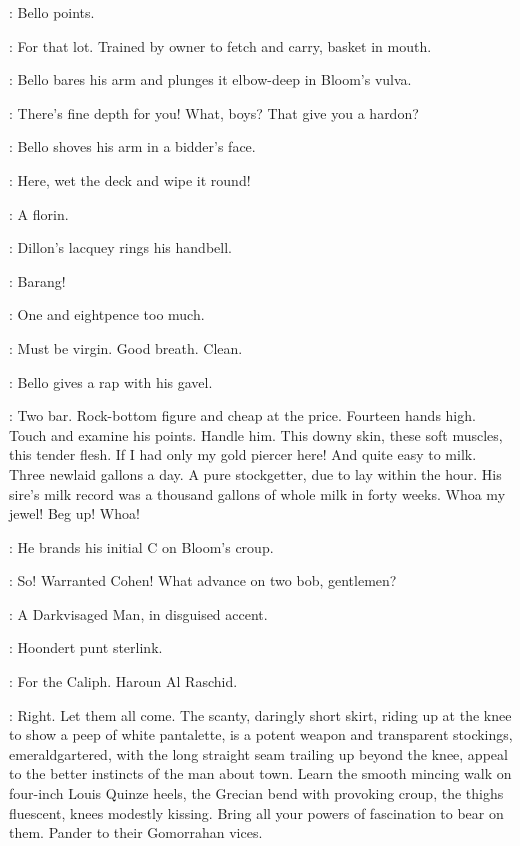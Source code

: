:
Bello points.

\Bello:
For that lot.
Trained by owner to fetch and carry, basket in mouth.

:
Bello bares his arm and plunges it elbow-deep in Bloom's vulva.

\Bello:
There's fine depth for you!
What, boys?
That give you a hardon?

:
Bello shoves his arm in a bidder's face.

\Bello:
Here, wet the deck and wipe it round!

\Bidder:
A florin.

:
Dillon's lacquey rings his handbell.

\Lacquey:
Barang!

\Voice:
One and eightpence too much.

\Marsh[2]:
Must be virgin.
Good breath.
Clean.

:
Bello gives a rap with his gavel.

\Bello:
Two bar.
Rock-bottom figure and cheap at the price.
Fourteen hands high.
Touch and examine his points.
Handle him.
This downy skin, these soft muscles, this tender flesh.
If I had only my gold piercer here!
And quite easy to milk.
Three newlaid gallons a day.
A pure stockgetter, due to lay within the hour.
His sire's milk record was a thousand gallons of whole milk in forty weeks.
Whoa my jewel!
Beg up!
Whoa!

:
He brands his initial C on Bloom's croup.

\Bello:
So!
Warranted Cohen!
What advance on two bob, gentlemen?

:
A Darkvisaged Man, in disguised accent.

\DarkvisagedMan:
Hoondert punt sterlink.

\Voices:
For the Caliph.
Haroun Al Raschid.

\Bello:
Right.
Let them all come.
The scanty, daringly short skirt,
riding up at the knee to show a peep of white pantalette,
is a potent weapon and transparent stockings, emeraldgartered,
with the long straight seam trailing up beyond the knee,
appeal to the better instincts of the  man about town.
Learn the smooth mincing walk on four-inch Louis Quinze heels,
the Grecian bend with provoking croup,
the thighs fluescent, knees modestly kissing.
Bring all your powers of fascination to bear on them.
Pander to their Gomorrahan vices.

